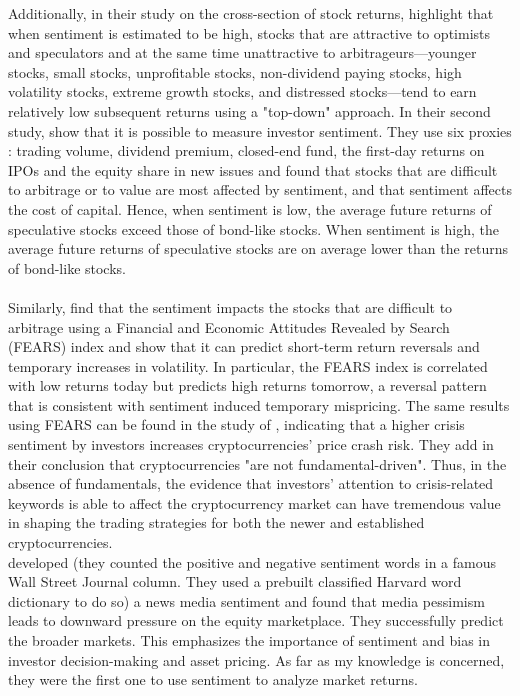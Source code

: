 \documentclass{article}
\begin{document}
	Additionally, in their study on the cross-section of stock returns, \cite{isatc} highlight that when sentiment is estimated to be high, stocks that are attractive to optimists and speculators and at the same time unattractive to arbitrageurs—younger stocks, small stocks, unprofitable stocks, non-dividend paying stocks, high volatility stocks, extreme growth stocks, and distressed stocks—tend to earn relatively low subsequent returns using a "top-down" approach. In their second study, \cite{isits} show that it is possible to measure investor sentiment. They use six proxies : trading volume, dividend premium, closed-end fund, the first-day returns on IPOs and the equity share in new issues and found that stocks that are difficult to arbitrage or to value are most affected by sentiment, and that sentiment affects the cost of capital. Hence, when sentiment is low, the average future returns of speculative stocks exceed those of bond-like stocks. When sentiment is high, the average future returns of speculative stocks are on average lower than the returns of bond-like stocks. \\\\
	Similarly, \cite{tsoaf} find that the sentiment impacts the stocks that are difficult to arbitrage using a Financial and Economic Attitudes Revealed by Search (FEARS) index and show that it can predict short-term return reversals and temporary increases in volatility. In particular, the FEARS index is correlated with low returns today but predicts high returns tomorrow, a reversal pattern that is consistent with sentiment induced temporary mispricing. The same results using FEARS can be found in the study of \cite{cpcra}, indicating that a higher crisis sentiment by investors increases cryptocurrencies’ price crash risk. They add in their conclusion that cryptocurrencies "are not fundamental-driven". Thus, in the absence of fundamentals, the evidence that investors’ attention to crisis-related keywords is able to affect the cryptocurrency market can have tremendous value in shaping the trading strategies for both the newer and established cryptocurrencies. \\
	
	\cite{gctis} developed (they counted the positive and negative sentiment words in a famous Wall Street Journal column. They used a prebuilt classified Harvard word dictionary to do so) a news media sentiment and found that media pessimism leads to downward pressure on the equity marketplace. They successfully predict the broader markets. This emphasizes the importance of sentiment and bias in investor decision-making and asset pricing. As far as my knowledge is concerned, they were the first one to use sentiment to analyze market returns. \\
	
\end{document}
